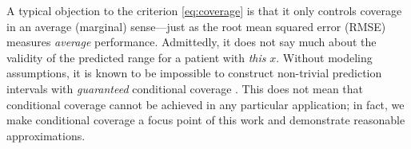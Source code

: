 A typical objection to the criterion \eqref{eq:coverage} is that it
only controls coverage in an average (marginal) sense---just as the
root mean squared error (RMSE) measures {\em average}
performance. Admittedly, it does not say much about the validity of
the predicted range for a patient with {\em this} $x$.
Without modeling assumptions, it is known to be impossible to
construct non-trivial prediction intervals with {\em guaranteed}
conditional coverage \citep{barber2019limits}. This does not mean that
conditional coverage cannot be achieved in any particular application;
in fact, we make conditional coverage a focus point of this work and
demonstrate reasonable approximations.



